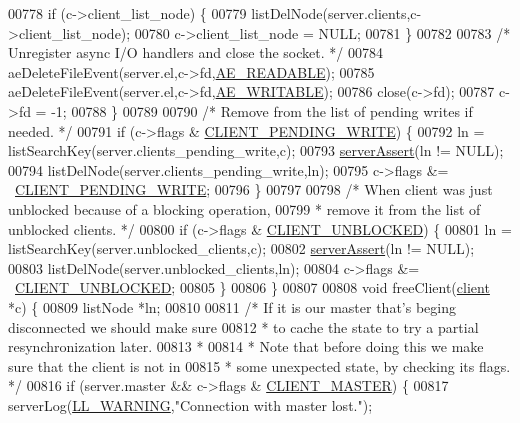 \begin{DoxyCode}
{{{{{{{{{00778         \textcolor{keywordflow}{if} (c->client\_list\_node) \{
00779             listDelNode(server.clients,c->client\_list\_node);
00780             c->client\_list\_node = NULL;
00781         \}
00782 
00783         \textcolor{comment}{/* Unregister async I/O handlers and close the socket. */}
00784         aeDeleteFileEvent(server.el,c->fd,\hyperlink{ae_8h_a7a9a2162d007d09739955b4e55c65bf3}{AE\_READABLE});
00785         aeDeleteFileEvent(server.el,c->fd,\hyperlink{ae_8h_ab6bfb0366ccb6277112d132c2a2bf500}{AE\_WRITABLE});
00786         close(c->fd);
00787         c->fd = -1;
00788     \}
00789 
00790     \textcolor{comment}{/* Remove from the list of pending writes if needed. */}
00791     \textcolor{keywordflow}{if} (c->flags & \hyperlink{server_8h_addd2e991874faef411339e9ae9619023}{CLIENT\_PENDING\_WRITE}) \{
00792         ln = listSearchKey(server.clients\_pending\_write,c);
00793         \hyperlink{server_8h_a88114b5169b4c382df6b56506285e56a}{serverAssert}(ln != NULL);
00794         listDelNode(server.clients\_pending\_write,ln);
00795         c->flags &= ~\hyperlink{server_8h_addd2e991874faef411339e9ae9619023}{CLIENT\_PENDING\_WRITE};
00796     \}
00797 
00798     \textcolor{comment}{/* When client was just unblocked because of a blocking operation,}
00799 \textcolor{comment}{     * remove it from the list of unblocked clients. */}
00800     \textcolor{keywordflow}{if} (c->flags & \hyperlink{server_8h_a1252372d6834686c29e958d9d96367a8}{CLIENT\_UNBLOCKED}) \{
00801         ln = listSearchKey(server.unblocked\_clients,c);
00802         \hyperlink{server_8h_a88114b5169b4c382df6b56506285e56a}{serverAssert}(ln != NULL);
00803         listDelNode(server.unblocked\_clients,ln);
00804         c->flags &= ~\hyperlink{server_8h_a1252372d6834686c29e958d9d96367a8}{CLIENT\_UNBLOCKED};
00805     \}
00806 \}
00807 
00808 \textcolor{keywordtype}{void} freeClient(\hyperlink{structclient}{client} *c) \{
00809     listNode *ln;
00810 
00811     \textcolor{comment}{/* If it is our master that's beging disconnected we should make sure}
00812 \textcolor{comment}{     * to cache the state to try a partial resynchronization later.}
00813 \textcolor{comment}{     *}
00814 \textcolor{comment}{     * Note that before doing this we make sure that the client is not in}
00815 \textcolor{comment}{     * some unexpected state, by checking its flags. */}
00816     \textcolor{keywordflow}{if} (server.master && c->flags & \hyperlink{server_8h_a3d8f0cc8d0653ee2b6dafb454292c069}{CLIENT\_MASTER}) \{
00817         serverLog(\hyperlink{server_8h_a31229b9334bba7d6be2a72970967a14b}{LL\_WARNING},\textcolor{stringliteral}{"Connection with master lost."});
}}}}}}}}}
\end{DoxyCode}
